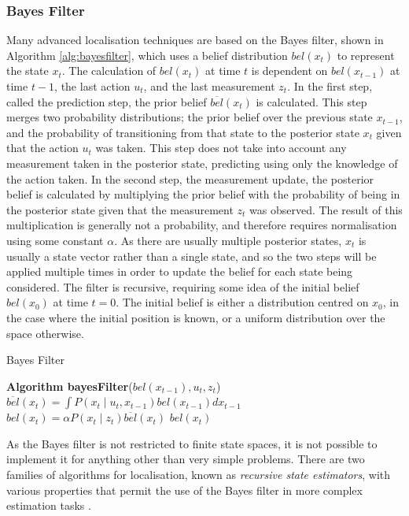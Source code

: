 \documentclass[conference]{IEEEtran}
\begin{document}
\subsubsection{Bayes Filter}
Many advanced localisation techniques are based on the Bayes filter, shown in Algorithm \ref{alg:bayesfilter}, which uses a belief distribution $bel(x_t)$ to represent the state $x_t$. The calculation of $bel(x_t)$ at time $t$ is dependent on $bel(x_{t-1})$ at time $t-1$, the last action $u_t$, and the last measurement $z_t$. In the first step, called the prediction step, the prior belief $\overline{bel}(x_t)$ is calculated. This step merges two probability distributions; the prior belief over the previous state $x_{t-1}$, and the probability of transitioning from that state to the posterior state $x_t$ given that the action $u_t$ was taken. This step does not take into account any measurement taken in the posterior state, predicting using only
the knowledge of the action taken. In the second step, the measurement update, the posterior belief is calculated by multiplying the prior belief with the probability of being in the posterior state given that the measurement $z_t$ was observed. The result of this multiplication is generally not a probability, and therefore requires normalisation using some constant $\alpha$. As there are usually multiple posterior states, $x_t$ is usually a state vector rather than a single state, and so the two steps will be applied multiple times in order to update the belief for each state being considered. The filter is recursive, requiring some idea of the initial belief $bel(x_0)$ at time $t=0$. The initial belief is either a distribution centred on $x_0$, in the case where the initial position is known, or a uniform distribution over the space otherwise.
\begin{algorithm}
  \caption{Bayes Filter \cite{thrun}}
  \label{alg:bayesfilter}
  \begin{algorithmic}[1]
        \State \textbf{Algorithm bayesFilter}\textnormal{($bel(x_{t-1}), u_t, z_t$)}
        \State $\overline{bel}(x_t)=\int P(x_t\mid u_t, x_{t-1})bel(x_{t-1})dx_{t-1}$
        \State $bel(x_t)=\alpha P(x_t \mid z_t)\overline{bel}(x_t)$
        \EndFor
        \State \Return $bel(x_t)$
  \end{algorithmic}
\end{algorithm}
As the Bayes filter is not restricted to finite state spaces, it is not possible to implement it for anything other than very simple problems. There are two families of algorithms for localisation, known as \emph{recursive state estimators}, with various properties that permit the use of the Bayes filter in more complex estimation tasks \cite{thrun}.
\end{document}
